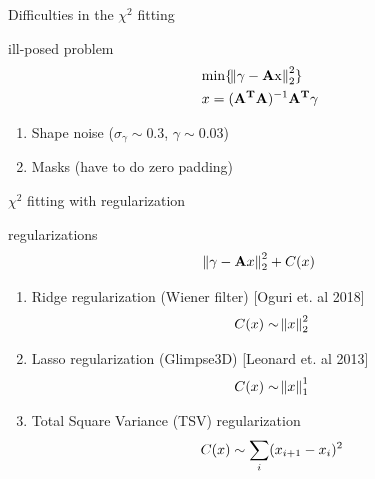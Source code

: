 \documentclass[10pt]{beamer}
\begin{document}
\begin{frame}{Difficulties in the $\chi^2$ fitting}
\begin{alertblock}{ill-posed problem}
\begin{equation}\notag
\begin{split}
&\rm{min} \{\norm{\gamma - \mathbf{A}x}^2_2\}\\
& x=(\mathbf{A^TA})^{-1} \mathbf{A^T} \gamma
\end{split}
\end{equation}

\begin{enumerate}
 \item Shape noise ($\sigma_\gamma \sim 0.3$, $\gamma \sim 0.03$)
 \item Masks (have to do zero padding)
\end{enumerate}

\end{alertblock}

\end{frame}

\begin{frame}{$\chi^2$ fitting with regularization}
\begin{alertblock}{regularizations}
\begin{equation}\notag
\norm{\gamma - \mathbf{A}x}^2_2 + C(x)
\end{equation}

\begin{enumerate}
 \item Ridge regularization (Wiener filter) [Oguri et. al 2018]
 \begin{equation}\notag
  C(x) \sim \norm{x}^2_2
 \end{equation}
 \item Lasso regularization (Glimpse3D) [Leonard et. al 2013]
 \begin{equation}\notag
  C(x) \sim \norm{x}^1_1
 \end{equation}
 \item Total Square Variance (TSV) regularization
 \begin{equation}\notag
  C(x) \sim \sum_i (x_{i+1}-x_{i})^2
 \end{equation}
\end{enumerate}

\end{alertblock}

\end{frame}
\end{document}
